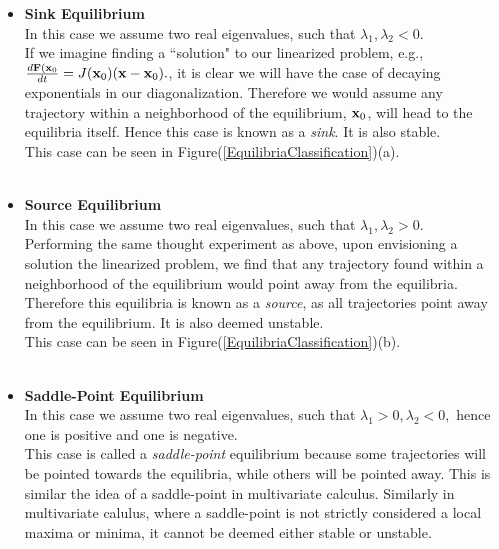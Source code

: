 %
%
%
% 
\begin{itemize}
\item[ ] {\bf{Sink Equilibrium}}\\

In this case we assume two real eigenvalues, such that $\lambda_1,\lambda_2<0.$\\

 If we imagine finding a ``solution" to our linearized problem, e.g., $\frac{d {\bf{F}}({\bf{x}}_0}{dt} = J({\bf{x}}_0)({\bf{x-x}}_0).$, it is clear we will have the case of decaying exponentials in our diagonalization. Therefore we would assume any trajectory within a neighborhood of the equilibrium, ${\bf{x}}_0$, will head to the equilibria itself. Hence this case is known as a \emph{sink}. It is also stable. \\

This case can be seen in Figure(\ref{EquilibriaClassification})(a). \\

$ $\\


\item[ ] {\bf{Source Equilibrium}}\\

In this case we assume two real eigenvalues, such that $\lambda_1,\lambda_2>0.$\\

Performing the same thought experiment as above, upon envisioning a solution the linearized problem, we find that any trajectory found within a neighborhood of the equilibrium would point away from the equilibria. Therefore this equilibria is known as a \emph{source}, as all trajectories point away from the equilibrium. It is also deemed unstable.\\

This case can be seen in Figure(\ref{EquilibriaClassification})(b).\\

$ $\\



\item[ ] {\bf{Saddle-Point Equilibrium}}\\

In this case we assume two real eigenvalues, such that $\lambda_1>0,\lambda_2<0,$ hence one is positive and one is negative.\\

This case is called a \emph{saddle-point} equilibrium because some trajectories will be pointed towards the equilibria, while others will be pointed away. This is similar the idea of a saddle-point in multivariate calculus. Similarly in multivariate calulus, where a saddle-point is not strictly considered a local maxima or minima, it cannot be deemed either stable or unstable. \\


\end{itemize}
